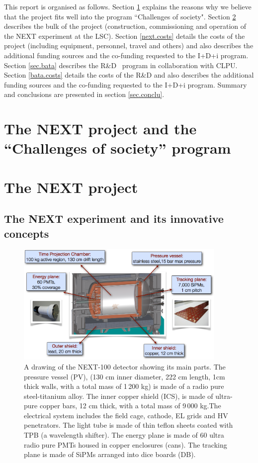 \documentclass[a4paper,11pt,oneside]{article}
\begin{document}
This report is organised as follows. Section \ref{sec.retos} explains the reasons why we believe that the project fits well into the program ``Challenges of society". Section \ref{sec.next} describes the bulk of the project (construction, commissioning and operation of the NEXT experiment at the LSC). Section \ref{next.costs} details the costs of the project (including equipment, personnel, travel and others) and also describes the additional funding sources and the co-funding requested to the I+D+i program.  Section \ref{sec.bata} describes the R\&D \BATA\ program in collaboration with CLPU. Section \ref{bata.costs} details the costs of the R\&D and also describes the additional funding sources and the co-funding requested to the I+D+i program.  Summary and conclusions are presented
in section \ref{sec.conclu}.

\section{\bf The NEXT project and the ``Challenges of society'' program }
\label{sec.retos}


\section{\bf The NEXT project}
\label{sec.next}

\subsection*{The NEXT experiment and its innovative concepts}

\begin{figure}
\centering
\includegraphics[width=0.9\textwidth]{img/NEXT.png}
\caption{\small A drawing of the NEXT-100 detector showing its main parts.  The pressure vessel (PV),  (130 cm inner diameter, 222 cm length, 1cm thick walls, with a total mass of 1\,200 kg) is made of a radio pure steel-titanium alloy.
The inner copper shield (ICS), is made of ultra-pure copper bars, 12 cm thick, with a total mass of 9\,000 kg.The electrical system includes the field cage, cathode, EL grids and HV penetrators.
The light tube is made of thin teflon sheets coated with TPB (a wavelength shifter). 
The energy plane is made of 60 ultra radio pure PMTs housed in copper enclosures (cans).
The tracking plane is made of SiPMs arranged into dice boards (DB). 
}\label{fig.NEXT100}
\end{figure}
\end{document}

